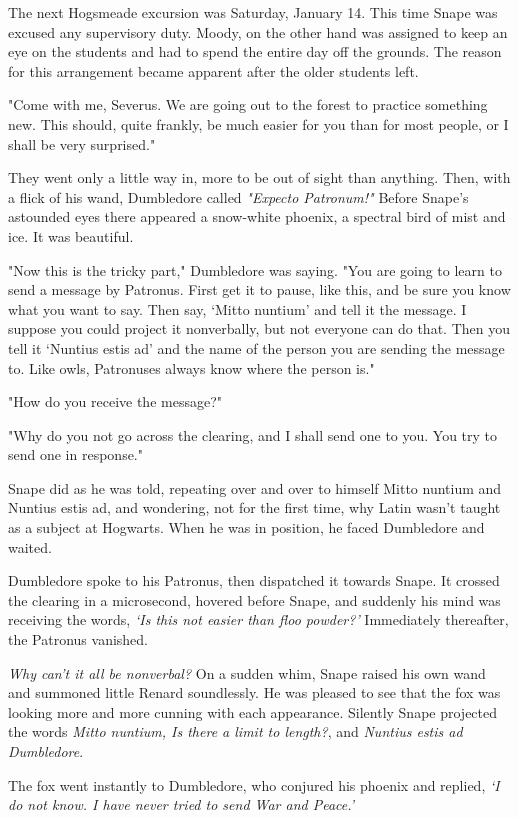 The next Hogsmeade excursion was Saturday, January 14. This time Snape was excused any supervisory duty. Moody, on the other hand was assigned to keep an eye on the students and had to spend the entire day off the grounds. The reason for this arrangement became apparent after the older students left.

"Come with me, Severus. We are going out to the forest to practice something new. This should, quite frankly, be much easier for you than for most people, or I shall be very surprised."

They went only a little way in, more to be out of sight than anything. Then, with a flick of his wand, Dumbledore called \emph{"Expecto Patronum!"} Before Snape's astounded eyes there appeared a snow-white phoenix, a spectral bird of mist and ice. It was beautiful.

"Now this is the tricky part," Dumbledore was saying. "You are going to learn to send a message by Patronus. First get it to pause, like this, and be sure you know what you want to say. Then say, `Mitto nuntium' and tell it the message. I suppose you could project it nonverbally, but not everyone can do that. Then you tell it `Nuntius estis ad{\el}' and the name of the person you are sending the message to. Like owls, Patronuses always know where the person is."

"How do you receive the message?"

"Why do you not go across the clearing, and I shall send one to you. You try to send one in response."

Snape did as he was told, repeating over and over to himself Mitto nuntium and Nuntius estis ad{\el}, and wondering, not for the first time, why Latin wasn't taught as a subject at Hogwarts. When he was in position, he faced Dumbledore and waited.

Dumbledore spoke to his Patronus, then dispatched it towards Snape. It crossed the clearing in a microsecond, hovered before Snape, and suddenly his mind was receiving the words, \emph{`Is this not easier than floo powder?'} Immediately thereafter, the Patronus vanished.

\emph{Why can't it all be nonverbal?} On a sudden whim, Snape raised his own wand and summoned little Renard soundlessly. He was pleased to see that the fox was looking more and more cunning with each appearance. Silently Snape projected the words \emph{Mitto nuntium, Is there a limit to length?}, and \emph{Nuntius estis ad Dumbledore}.

The fox went instantly to Dumbledore, who conjured his phoenix and replied, \emph{`I do not know. I have never tried to send War and Peace.'}

